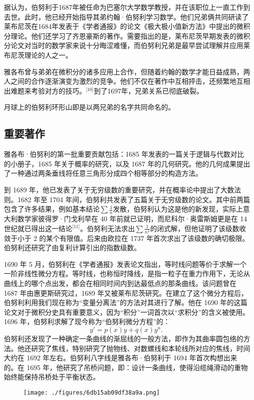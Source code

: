 据认为，伯努利于1687年被任命为巴塞尔大学数学教授，并在该职位上一直工作到去世。此时，他已经开始指导其弟约翰·伯努利学习数学。他们兄弟俩共同研读了莱布尼茨在1684年发表于《学者通报》的论文《极大极小值新方法》中提出的微积分理论。他们还学习了齐恩豪斯的著作。需要指出的是，莱布尼茨早期发表的微积分论文对当时的数学家来说十分晦涩难懂，而伯努利兄弟是最早尝试理解并应用莱布尼茨理论的人之一。

雅各布曾与弟弟在微积分的诸多应用上合作，但随着约翰的数学才能日益成熟，两人之间的合作逐渐演变为激烈的竞争。他们不仅在著作中互相抨击，还频繁地互相出难题来考验对方的技巧。\(^\text{[10]}\)到了1697年，兄弟关系已彻底破裂。

月球上的伯努利环形山即是以两兄弟的名字共同命名的。
\subsection{重要著作}
雅各布·伯努利的第一批重要贡献包括：1685 年发表的一篇关于逻辑与代数对比的小册子，1685 年关于概率的研究，以及 1687 年的几何研究。他的几何成果提出了一种通过两条垂线将任意三角形分成四个相等部分的构造方法。

到 1689 年，他已发表了关于无穷级数的重要研究，并在概率论中提出了大数法则。1682 年至 1704 年间，伯努利共发表了五篇关于无穷级数的论文。其中前两篇包含了许多结果，例如基本结论$\sum \frac{1}{n}$发散，伯努利认为这是他的新发现，实际上意大利数学家彼得罗·门戈利早在 40 年前就已证明，而尼科尔·奥雷斯姆更是在 14 世纪就已得出这一结论\(^\text{[11]}\)。伯努利无法求出$\sum \frac{1}{n^2}$的闭式解，但他证明了该级数收敛于小于 2 的某个有限值。后来由欧拉在 1737 年首次求出了该级数的确切极限。伯努利还研究了由复利计算引出的指数级数。

1690 年 5 月，伯努利在《学者通报》发表论文指出，等时线问题等价于求解一个一阶非线性微分方程。等时线，也称恒时降线，是指一粒子在重力作用下，无论从曲线上的哪个点出发，都会在相同时间内到达最低点的那条曲线。该问题曾在 1687 年由惠更斯研究过，1689 年又被莱布尼茨研究。在建立了这个微分方程后，伯努利利用我们现在称为“变量分离法”的方法对其进行了解。他在 1690 年的这篇论文对于微积分史具有重要意义，因为“积分”一词首次以“求积分”的含义被使用。1696 年，伯努利求解了现今称为“伯努利微分方程”的：
$$
y' = p(x)y + q(x)y^n.~
$$
伯努利还发现了一种确定一条曲线的渐屈线的一般方法，即作为其曲率圆包络的方法。他还研究了焦线，特别研究了抛物线、对数螺线和本轮线所对应的焦线，时间大约在 1692 年左右。伯努利八字线是雅各布·伯努利于 1694 年首次构想出来的。在 1695 年，他研究了吊桥问题，即：设计一条曲线，使得沿缆绳滑动的重物始终能保持吊桥处于平衡状态。
\begin{figure}[ht]
\centering
\texttt{[image: ./figures/6db15ab09df38a9a.png]}
\caption{} \label{fig_YGBbnl_3}
\end{figure}